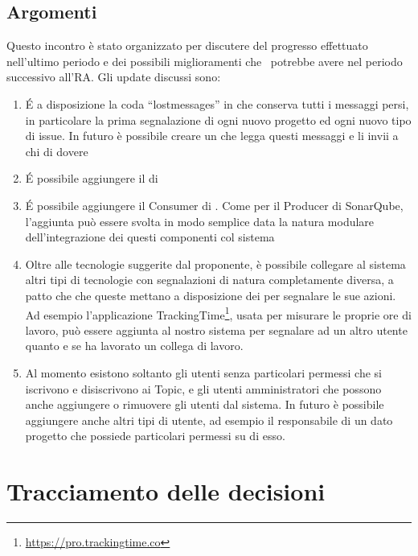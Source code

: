         \subsection{Argomenti}
            Questo incontro è stato organizzato per discutere del progresso effettuato nell'ultimo periodo e dei possibili miglioramenti che \progetto\ potrebbe avere nel periodo successivo all'RA. Gli update discussi sono:
            \begin{enumerate}
            	\item É a disposizione la coda ``lostmessages'' in  che conserva tutti i messaggi persi, in particolare la prima segnalazione di ogni nuovo progetto ed ogni nuovo tipo di issue. In futuro è possibile creare un  che legga questi messaggi e li invii a chi di dovere
            	\item É possibile aggiungere il  di 
            	\item É possibile aggiungere il Consumer di . Come per il Producer di SonarQube, l'aggiunta può essere svolta in modo semplice data la natura modulare dell’integrazione dei questi componenti col sistema
            	\item Oltre alle tecnologie suggerite dal proponente, è possibile collegare al sistema altri tipi di tecnologie con segnalazioni di natura completamente diversa, a patto che che queste mettano a disposizione dei  per segnalare le sue azioni. Ad esempio l’applicazione TrackingTime\footnote{\url{https://pro.trackingtime.co}}, usata per misurare le proprie ore di lavoro, può essere aggiunta al nostro sistema per segnalare ad un altro utente quanto e se ha lavorato un collega di lavoro.
            	\item Al momento esistono soltanto gli utenti senza particolari permessi che si iscrivono e disiscrivono ai Topic, e gli utenti amministratori che possono anche aggiungere o rimuovere gli utenti dal sistema. In futuro è possibile aggiungere anche altri tipi di utente, ad esempio il responsabile di un dato progetto che possiede particolari permessi su di esso.          	
            \end{enumerate}

        \section{Tracciamento delle decisioni}

